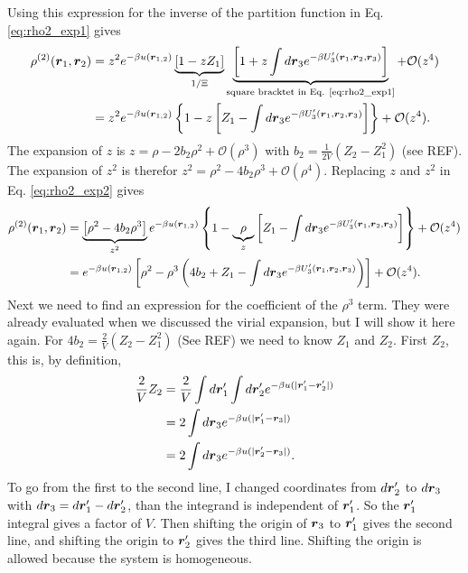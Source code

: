 Using this expression for the inverse of the partition function in Eq. \eqref{eq:rho2_exp1} gives
\begin{align}
\rho^{(2)}(\boldsymbol{r}_1,\boldsymbol{r}_2) &= z^2 e^{-\beta u(\boldsymbol{r}_{1,2})}
    \underbrace{
    \left[ 1 - z Z_1 \right]
    }_{1/\Xi}
    \underbrace{
    \left[ 1 + z \int d\boldsymbol{r}_3 e^{-\beta U'_3(\boldsymbol{r}_1,\boldsymbol{r}_2,\boldsymbol{r}_3)} \right]}_\text{square bracktet in Eq. \eqref{eq:rho2_exp1}}
    + \mathcal{O}(z^4) \\
&= z^2 e^{-\beta u(\boldsymbol{r}_{1,2})} \left\{1 - z \left[ Z_1 - \int d\boldsymbol{r}_3 e^{-\beta U'_3(\boldsymbol{r}_1,\boldsymbol{r}_2,\boldsymbol{r}_3)} \right] \right\} + \mathcal{O}(z^4).
\label{eq:rho2_exp2}
\end{align}
The expansion of $z$ is
$z = \rho - 2b_2\rho^2 + \mathcal{O}(\rho^3)$
with $b_2 = \frac{1}{2 V} (Z_2-Z_1^2)$ (see REF).
The expansion of $z^2$ is therefor
$z^2 = \rho^2 - 4 b_2 \rho^3 + \mathcal{O}(\rho^4)$.
Replacing $z$ and $z^2$ in Eq. \eqref{eq:rho2_exp2} gives
\begin{align}
\rho^{(2)}(\boldsymbol{r}_1,\boldsymbol{r}_2) &=
    \underbrace{ \left[ \rho^2 - 4b_2 \rho^3 \right] }_{z^2}
     e^{-\beta u(\boldsymbol{r}_{1,2})} \left\{1 - 
    \underbrace{\rho}_{z} \left[ Z_1 - \int d\boldsymbol{r}_3 e^{-\beta U'_3(\boldsymbol{r}_1,\boldsymbol{r}_2,\boldsymbol{r}_3)} \right] \right\} + \mathcal{O}(z^4)\\
&= e^{-\beta u(\boldsymbol{r}_{1,2})} \left[\rho^2 - 
    \rho^3 \left(4b_2 + Z_1 - \int d\boldsymbol{r}_3 e^{-\beta U'_3(\boldsymbol{r}_1,\boldsymbol{r}_2,\boldsymbol{r}_3)} \right) \right] + \mathcal{O}(z^4).
\label{eq:rho2_exp3}
\end{align}
Next we need to find an expression for the coefficient of the $\rho^3$ term.
They were already evaluated when we discussed the virial expansion, but I will show it here again.
For $4 b_2 = \frac{2}{V} \left( Z_2 - Z_1^2 \right)$ (See REF)
we need to know $Z_1$ and $Z_2$.
First $Z_2$, this is, by definition,
\begin{align}
\frac{2}{V} Z_2 &= \frac{2}{V} \int d\boldsymbol{r}'_1 \int d\boldsymbol{r}'_2
    e^{-\beta u(|\boldsymbol{r}'_1 - \boldsymbol{r}'_2|)} \\
&= 2 \int d\boldsymbol{r}_3 e^{-\beta u(|\boldsymbol{r}'_1 - \boldsymbol{r}_3|)}\\
&= 2 \int d\boldsymbol{r}_3 e^{-\beta u(|\boldsymbol{r}'_2 - \boldsymbol{r}_3|)}.
\end{align}
To go from the first to the second line, I changed coordinates from $d\boldsymbol{r}'_2$ to  $d\boldsymbol{r}_3$ with
$d\boldsymbol{r}_3 = d\boldsymbol{r}'_1 - d\boldsymbol{r}'_2$, than the integrand is 
independent of $\boldsymbol{r}'_1$.
So the $\boldsymbol{r}'_1$ integral gives a factor of $V$.
Then shifting the origin of $\boldsymbol{r}_3$ to $\boldsymbol{r}'_1$ gives the 
second line, and shifting the origin to $\boldsymbol{r}'_2$ gives the 
third line.
Shifting the origin is allowed because the system is homogeneous.
